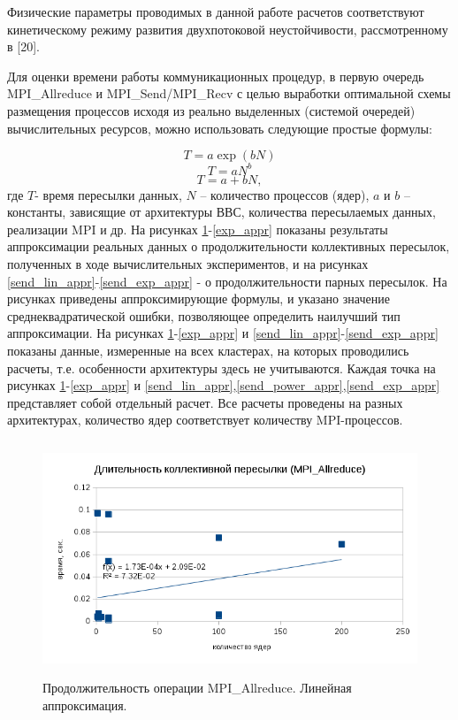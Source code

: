         Физические параметры проводимых в данной работе расчетов соответствуют кинетическому режиму развития двухпотоковой неустойчивости, рассмотренному в [20].
        
        Для оценки времени работы коммуникационных процедур, в первую очередь MPI\_Allreduce и MPI\_Send/MPI\_Recv с целью выработки оптимальной схемы размещения процессов исходя из реально выделенных (системой очередей) вычислительных ресурсов, можно использовать следующие простые формулы:
        
$$
T = a \exp (b N)
$$
$$
T = a N^b
$$
$$
T = a +bN,
$$
        где $T$- время пересылки данных, $N$ – количество процессов (ядер), $a$ и $b$ – константы, зависящие от архитектуры ВВС, количества пересылаемых данных, реализации MPI и др. На рисунках \ref{lin_appr}-\ref{exp_appr} показаны результаты аппроксимации реальных данных о продолжительности коллективных пересылок, полученных в ходе вычислительных экспериментов, и на рисунках \ref{send_lin_appr}-\ref{send_exp_appr} - о продолжительности парных пересылок. На рисунках приведены аппроксимирующие формулы, и указано значение среднеквадратической ошибки, позволяющее определить наилучший тип аппроксимации. На рисунках \ref{lin_appr}-\ref{exp_appr} и \ref{send_lin_appr}-\ref{send_exp_appr} показаны данные, измеренные на всех кластерах, на которых проводились расчеты, т.е. особенности архитектуры здесь не учитываются.
        Каждая точка на рисунках \ref{lin_appr}-\ref{exp_appr} и \ref{send_lin_appr},\ref{send_power_appr},\ref{send_exp_appr} представляет собой отдельный расчет. Все расчеты проведены на разных архитектурах, количество ядер соответствует количеству MPI-процессов.
        
        \begin{figure}[htb]
        	\begin{center}
        		\includegraphics[height=7cm,keepaspectratio]{images/RomanenkoAASnytnikovAVChernykhIGadaptationtosupercomputerfinalEXTENDEDREFERENCES-img2.png}
        	\end{center}
        	\caption{Продолжительность операции MPI\_Allreduce. Линейная аппроксимация.}
        	\label{lin_appr}
        \end{figure}
        
